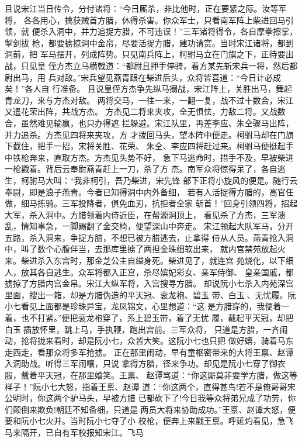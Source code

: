 且说宋江当日传令，分付诸将：“今日厮杀，非比他时，正在要紧之际。汝等军将，
各各用心，擒获贼首方腊，休得杀害。你众军士，只看南军阵上柴进回马引领，就
便杀入洞中，并力追捉方腊，不可违误！”三军诸将得令，各自摩拳擦掌，掣剑拔
枪，都要掳掠洞中金帛，尽要活捉方腊，建功请赏。当时宋江诸将，都到洞前，把
军马摆开，列成阵势。只见南兵阵上，柯驸马立在门旗之下，正待要出战，只见皇
侄方杰立马横戟道：“都尉且押手停骑，看方某先斩宋兵一将，然后都尉出马，用
兵对敌。”宋兵望见燕青跟在柴进后头，众将皆喜道：“今日计必成矣！”各人自
行准备。
且说皇侄方杰争先纵马搦战，宋江阵上，关胜出马，舞起青龙刀，来与方杰对敌。
两将交马，一往一来，一翻一复，战不过十数合，宋江又遣花荣出阵，共战方杰。
方杰见二将来夹攻，全无惧怯，力敌二将。又战数合，虽然难见输赢，也只办得遮
拦躲避。宋江队里，再差李应、朱仝骤马出阵，并力追杀。方杰见四将来夹攻，方
才拨回马头，望本阵中便走。柯驸马却在门旗下截住，把手一招，宋将关胜、花荣、
朱仝、李应四将赶过来。柯驸马便挺起手中铁枪奔来，直取方杰。方杰见头势不好，
急下马逃命时，措手不及，早被柴进一枪戳着。背后云奉尉燕青赶上一刀，杀了方
杰。南军众将惊得呆了，各自逃生，柯驸马大叫：“我非柯引，吾乃柴进，宋先锋
部下正将小旋风的便是。随行云奉尉，即是浪子燕青。今者已知得洞中内外备细，
若有人活捉得方腊的，高官任做，细马拣骑。三军投降者，俱免血刃，抗拒者全家
斩首！”回身引领四将，招起大军，杀入洞中。方腊领着内侍近臣，在帮源洞顶上，
看见杀了方杰，三军溃乱，情知事急，一脚踢翻了金交椅，便望深山中奔走。
宋江领起大队军马，分开五路，杀入洞来，争捉方腊，不想已被方腊逃去，止拿得
侍从人员。燕青抢入洞中，叫了数个心腹伴当，去那库里掳了两担金珠细软出来，
就内宫禁苑放起火来。柴进杀入东宫时，那金芝公主自缢身死。柴进见了，就连宫
苑烧化，以下细人，放其各自逃生。众军将都入正宫，杀尽嫔妃彩女、亲军侍御、
皇亲国戚，都掳掠了方腊内宫金帛。宋江大纵军将，入宫搜寻方腊。
却说阮小七杀入内苑深宫里面，搜出一箱，却是方腊伪造的平天冠、衮龙袍、碧玉
带、白玉、无忧履。阮小七看见上面都是珍珠异宝，龙凤锦文，心里想道：“这
是方腊穿的，我便着一着，也不打紧。”便把衮龙袍穿了，系上碧玉带，着了无忧
履，戴起平天冠，却把白玉插放怀里，跳上马，手执鞭，跑出宫前。三军众将，
只道是方腊，一齐闹动，抢将拢来看时，却是阮小七，众皆大笑。这阮小七也只把
做好嬉，骑着马东走西走，看那众将多军抢掳。
正在那里闹动，早有童枢密带来的大将王禀、赵谭入洞助战。听得三军闹嚷，只说
拿得方腊，径来争功。却见是阮小七穿了御衣服，戴着平天冠，在那里嬉笑。王禀、
赵谭骂道：“你这厮莫非要学方腊，做这等样子！”阮小七大怒，指着王禀、赵谭
道：“你这两个，直得甚鸟!若不是俺哥哥宋公明时，你这两个驴马头，早被方腊
已都砍下了!今日我等众将弟兄成了功劳，你们颠倒来欺负!朝廷不知备细，只道是
两员大将来协助成功。”王禀、赵谭大怒，便要和阮小七火并。当时阮小七夺了小
校枪，便奔上来戳王禀。呼延灼看见，急飞马来隔开，已自有军校报知宋江。飞马
